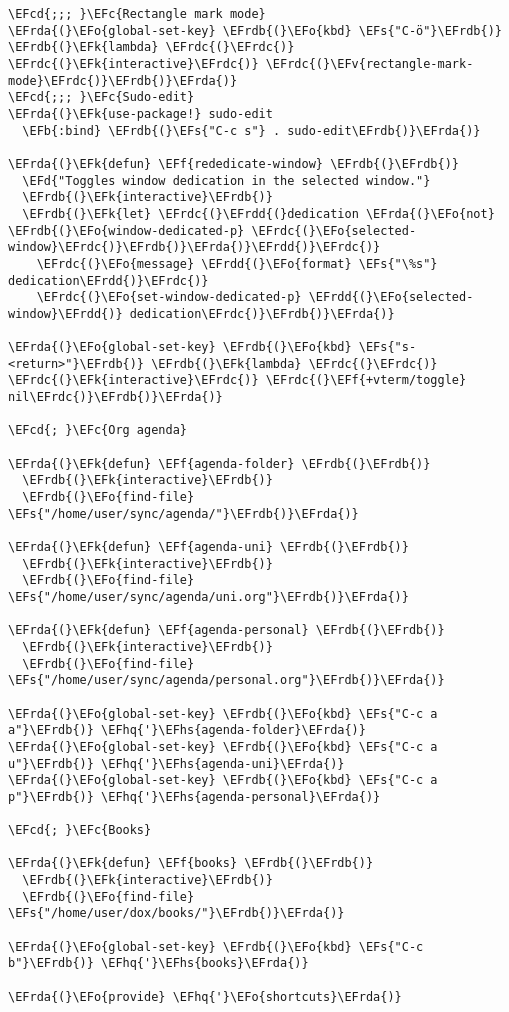 \documentclass[a4wide,10pt]{article}
\newcommand{\EFc}[1]{\textcolor{EFc}{#1}} %
\newcommand{\EFcd}[1]{\textcolor{EFcd}{#1}} %
\newcommand{\EFs}[1]{\textcolor{EFs}{#1}} %
\newcommand{\EFd}[1]{\textcolor{EFd}{#1}} %
\newcommand{\EFk}[1]{\textcolor{EFk}{#1}} %
\newcommand{\EFb}[1]{\textcolor{EFb}{#1}} %
\newcommand{\EFf}[1]{\textcolor{EFf}{#1}} %
\newcommand{\EFv}[1]{\textcolor{EFv}{#1}} %
\newcommand{\EFo}[1]{\textcolor{EFo}{#1}} %
\newcommand{\EFhq}[1]{\textcolor{EFhq}{#1}} %
\newcommand{\EFhs}[1]{\textcolor{EFhs}{#1}} %
\newcommand{\EFrda}[1]{\textcolor{EFrda}{#1}} %
\newcommand{\EFrdb}[1]{\textcolor{EFrdb}{#1}} %
\newcommand{\EFrdc}[1]{\textcolor{EFrdc}{#1}} %
\newcommand{\EFrdd}[1]{\textcolor{EFrdd}{#1}} %
\begin{document}
\begin{Code}
\begin{Verbatim}
\EFcd{;;; }\EFc{Rectangle mark mode}
\EFrda{(}\EFo{global-set-key} \EFrdb{(}\EFo{kbd} \EFs{"C-ö"}\EFrdb{)} \EFrdb{(}\EFk{lambda} \EFrdc{(}\EFrdc{)} \EFrdc{(}\EFk{interactive}\EFrdc{)} \EFrdc{(}\EFv{rectangle-mark-mode}\EFrdc{)}\EFrdb{)}\EFrda{)}
\EFcd{;;; }\EFc{Sudo-edit}
\EFrda{(}\EFk{use-package!} sudo-edit
  \EFb{:bind} \EFrdb{(}\EFs{"C-c s"} . sudo-edit\EFrdb{)}\EFrda{)}

\EFrda{(}\EFk{defun} \EFf{rededicate-window} \EFrdb{(}\EFrdb{)}
  \EFd{"Toggles window dedication in the selected window."}
  \EFrdb{(}\EFk{interactive}\EFrdb{)}
  \EFrdb{(}\EFk{let} \EFrdc{(}\EFrdd{(}dedication \EFrda{(}\EFo{not} \EFrdb{(}\EFo{window-dedicated-p} \EFrdc{(}\EFo{selected-window}\EFrdc{)}\EFrdb{)}\EFrda{)}\EFrdd{)}\EFrdc{)}
    \EFrdc{(}\EFo{message} \EFrdd{(}\EFo{format} \EFs{"\%s"} dedication\EFrdd{)}\EFrdc{)}
    \EFrdc{(}\EFo{set-window-dedicated-p} \EFrdd{(}\EFo{selected-window}\EFrdd{)} dedication\EFrdc{)}\EFrdb{)}\EFrda{)}

\EFrda{(}\EFo{global-set-key} \EFrdb{(}\EFo{kbd} \EFs{"s-<return>"}\EFrdb{)} \EFrdb{(}\EFk{lambda} \EFrdc{(}\EFrdc{)} \EFrdc{(}\EFk{interactive}\EFrdc{)} \EFrdc{(}\EFf{+vterm/toggle} nil\EFrdc{)}\EFrdb{)}\EFrda{)}

\EFcd{; }\EFc{Org agenda}

\EFrda{(}\EFk{defun} \EFf{agenda-folder} \EFrdb{(}\EFrdb{)}
  \EFrdb{(}\EFk{interactive}\EFrdb{)}
  \EFrdb{(}\EFo{find-file} \EFs{"/home/user/sync/agenda/"}\EFrdb{)}\EFrda{)}

\EFrda{(}\EFk{defun} \EFf{agenda-uni} \EFrdb{(}\EFrdb{)}
  \EFrdb{(}\EFk{interactive}\EFrdb{)}
  \EFrdb{(}\EFo{find-file} \EFs{"/home/user/sync/agenda/uni.org"}\EFrdb{)}\EFrda{)}

\EFrda{(}\EFk{defun} \EFf{agenda-personal} \EFrdb{(}\EFrdb{)}
  \EFrdb{(}\EFk{interactive}\EFrdb{)}
  \EFrdb{(}\EFo{find-file} \EFs{"/home/user/sync/agenda/personal.org"}\EFrdb{)}\EFrda{)}

\EFrda{(}\EFo{global-set-key} \EFrdb{(}\EFo{kbd} \EFs{"C-c a a"}\EFrdb{)} \EFhq{'}\EFhs{agenda-folder}\EFrda{)}
\EFrda{(}\EFo{global-set-key} \EFrdb{(}\EFo{kbd} \EFs{"C-c a u"}\EFrdb{)} \EFhq{'}\EFhs{agenda-uni}\EFrda{)}
\EFrda{(}\EFo{global-set-key} \EFrdb{(}\EFo{kbd} \EFs{"C-c a p"}\EFrdb{)} \EFhq{'}\EFhs{agenda-personal}\EFrda{)}

\EFcd{; }\EFc{Books}

\EFrda{(}\EFk{defun} \EFf{books} \EFrdb{(}\EFrdb{)}
  \EFrdb{(}\EFk{interactive}\EFrdb{)}
  \EFrdb{(}\EFo{find-file} \EFs{"/home/user/dox/books/"}\EFrdb{)}\EFrda{)}

\EFrda{(}\EFo{global-set-key} \EFrdb{(}\EFo{kbd} \EFs{"C-c b"}\EFrdb{)} \EFhq{'}\EFhs{books}\EFrda{)}

\EFrda{(}\EFo{provide} \EFhq{'}\EFo{shortcuts}\EFrda{)}
\end{Verbatim}
\end{Code}
\end{document}
